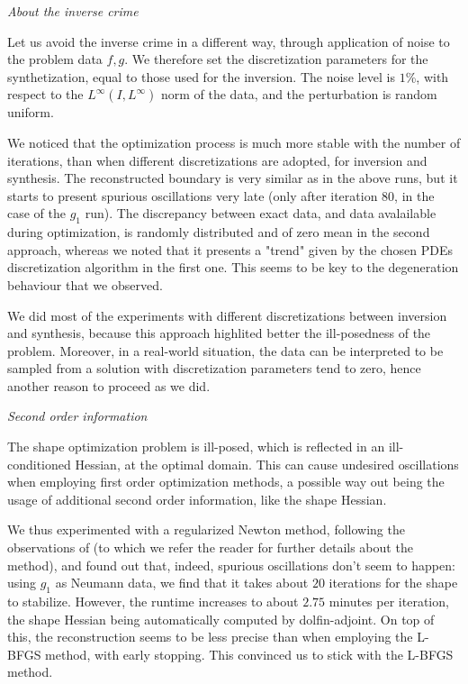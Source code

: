 \documentclass[english,a4paper,9pt,oneside]{scrbook}	%
\theoremstyle{break}
\theoremstyle{remark}
\begin{document}
\textit{About the inverse crime}

Let us avoid the inverse crime in a different way, through application of noise to the problem data $f,g$. We therefore set the discretization parameters for the synthetization, equal to those used for the inversion. The noise level is $1$\%, with respect to the $L^\infty(I,L^\infty)$ norm of the data, and the perturbation is random uniform. 

We noticed that the optimization process is much more stable with the number of iterations, than when different discretizations are adopted, for inversion and synthesis. The reconstructed boundary is very similar as in the above runs, but it starts to present spurious oscillations  very late (only after iteration $80$, in the case of the $g_1$ run). The discrepancy between exact data, and data avalailable during optimization, is randomly distributed and of zero mean in the second approach, whereas we noted that it presents a "trend" given by the chosen PDEs discretization algorithm in the first one. This seems to be key to the degeneration behaviour that we observed. 

We did most of the experiments with different discretizations between inversion and synthesis, because this approach highlited better the ill-posedness of the problem. Moreover, in a real-world situation, the data can be interpreted to be sampled from a solution with discretization parameters tend to zero, hence another reason to proceed as we did.

\textit{Second order information}

The shape optimization problem is ill-posed, which is reflected in an ill-conditioned Hessian, at the optimal domain. This can cause undesired oscillations when employing first order optimization methods, a possible way out being the usage of additional second order information, like the shape Hessian.

We thus experimented with a regularized Newton method, following the observations of \cite{eppler} (to which we refer the reader for further details about the method), and found out that, indeed, spurious oscillations don't seem to happen: using $g_1$ as Neumann data, we find that it takes about $20$ iterations for the shape to stabilize. However, the runtime increases to about $2.75$ minutes per iteration, the shape Hessian being automatically computed by dolfin-adjoint. On top of this, the reconstruction seems to be less precise than when employing the L-BFGS method, with early stopping. This convinced us to stick with the L-BFGS method. 
\end{document}
